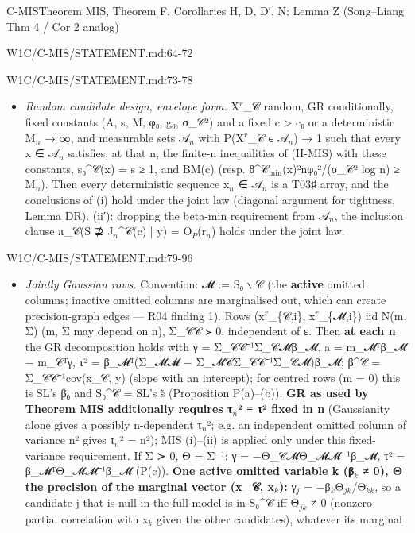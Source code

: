 \begin{card}{C-MIS}{Theorem MIS, Theorem F, Corollaries H, D, D′, N; Lemma Z (Song–Liang Thm 4 / Cor 2 analog)}
\begin{stmt}{W1C/C-MIS/STATEMENT.md:64-72}
\end{stmt}
\begin{stmt}{W1C/C-MIS/STATEMENT.md:73-78}
\begin{itemize}
\item[(ii)] \emph{Random candidate design, envelope form.} X$^{r}$\_𝒞 random, GR conditionally, fixed constants (A, s, M, φ₀, g₀, σ\_𝒞²)
and a fixed c > c₀ or a deterministic M$_{n}$ → ∞, and measurable sets 𝒜$_{n}$ with P(X$^{r}$\_𝒞 ∈ 𝒜$_{n}$) → 1 such that every
x ∈ 𝒜$_{n}$ satisfies, at that n, the finite-n inequalities of (H-MIS) with these constants, s₀\^{}𝒞(x) = s ≥ 1, and
BM(c) (resp. θ\^{}𝒞$_{\mathrm{min}}$(x)²nφ₀²/(σ\_𝒞² log n) ≥ M$_{n}$). Then every deterministic sequence x$_{n}$ ∈ 𝒜$_{n}$ is a T03♯ array,
and the conclusions of (i) hold under the joint law (diagonal argument for tightness, Lemma DR). (ii′): dropping the
beta-min requirement from 𝒜$_{n}$, the inclusion clause π\_𝒞(S ⊉ J$_{n}$\^{}𝒞(c) | y) = O$_{P}$(r$_{n}$) holds under the joint law.
\end{itemize}
\end{stmt}
\begin{stmt}{W1C/C-MIS/STATEMENT.md:79-96}
\begin{itemize}
\item[(iii)] \emph{Jointly Gaussian rows.} Convention: 𝓜 := S₀ ∖ 𝒞 (the \textbf{active} omitted columns; inactive omitted columns are
marginalised out, which can create precision-graph edges — R04 finding 1). Rows (x$^{r}$\_\{𝒞,i\}, x$^{r}$\_\{𝓜,i\}) iid N(m, Σ)
(m, Σ may depend on n), Σ\_𝒞𝒞 ≻ 0, independent of ε. Then \textbf{at each n} the GR decomposition holds with
γ = Σ\_𝒞𝒞⁻¹Σ\_𝒞𝓜β\_𝓜, a = m\_𝓜ᵀβ\_𝓜 − m\_𝒞ᵀγ, τ² = β\_𝓜ᵀ(Σ\_𝓜𝓜 − Σ\_𝓜𝒞Σ\_𝒞𝒞⁻¹Σ\_𝒞𝓜)β\_𝓜; β\^{}𝒞 = Σ\_𝒞𝒞⁻¹cov(x\_𝒞, y) (slope with an
intercept); for centred rows (m = 0) this is SL's β₀ and S₀\^{}𝒞 = SL's s̃ (Proposition P(a)–(b)). \textbf{GR as used by Theorem MIS additionally requires τ$_{n}$² ≡ τ² fixed in n}
(Gaussianity alone gives a possibly n-dependent τ$_{n}$²; e.g. an independent omitted column of variance n² gives
τ$_{n}$² = n²); MIS (i)–(ii) is applied only under this fixed-variance requirement. If Σ ≻ 0, Θ = Σ⁻¹: γ = −Θ\_𝒞𝓜Θ\_𝓜𝓜⁻¹β\_𝓜,
τ² = β\_𝓜ᵀΘ\_𝓜𝓜⁻¹β\_𝓜 (P(c)).
\textbf{One active omitted variable k (β$_{k}$ ≠ 0), Θ the precision of the marginal vector (x\_𝒞, x$_{k}$):} γ$_{j}$ = −β$_{k}$Θ$_{jk}$/Θ$_{kk}$, so a candidate j that is null in the full model is
in S₀\^{}𝒞 iff Θ$_{jk}$ ≠ 0 (nonzero partial correlation with x$_{k}$ given the other candidates), whatever its marginal

\end{itemize}
\end{stmt}
\end{card}
